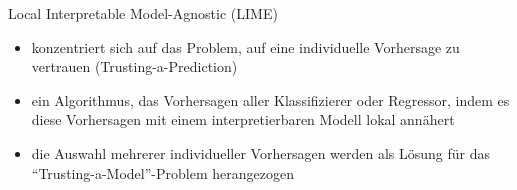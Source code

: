 \documentclass{beamer}
\begin{document}
  \begin{frame}{Local Interpretable Model-Agnostic (LIME)}
    \begin{itemize}
      \item konzentriert sich auf das Problem, auf eine individuelle Vorhersage zu vertrauen (Trusting-a-Prediction)
      \item ein Algorithmus, das Vorhersagen aller Klassifizierer oder Regressor, indem es diese Vorhersagen mit einem interpretierbaren Modell lokal annähert
      \item die Auswahl mehrerer individueller Vorhersagen werden als Lösung für das "`Trusting-a-Model"'-Problem herangezogen
    \end{itemize}
  \end{frame}


  
\end{document}
